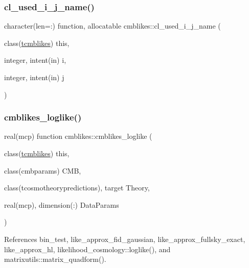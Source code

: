 \mbox{\label{namespacecmblikes_aed345a121b78d08d7aa703636785f56b}} 
\subsubsection{\texorpdfstring{cl\+\_\+used\+\_\+i\+\_\+j\+\_\+name()}{cl\_used\_i\_j\_name()}}
{\footnotesize\ttfamily character(len=\+:) function, allocatable cmblikes\+::cl\+\_\+used\+\_\+i\+\_\+j\+\_\+name (\begin{DoxyParamCaption}\item[{class(\mbox{\hyperlink{structcmblikes_1_1tcmblikes}{tcmblikes}})}]{this,  }\item[{integer, intent(in)}]{i,  }\item[{integer, intent(in)}]{j }\end{DoxyParamCaption})\hspace{0.3cm}{\ttfamily [private]}}

\mbox{\label{namespacecmblikes_a97fb12e9b7c8a1059a8443b1b0423c24}} 
\subsubsection{\texorpdfstring{cmblikes\+\_\+loglike()}{cmblikes\_loglike()}}
{\footnotesize\ttfamily real(mcp) function cmblikes\+::cmblikes\+\_\+loglike (\begin{DoxyParamCaption}\item[{class(\mbox{\hyperlink{structcmblikes_1_1tcmblikes}{tcmblikes}})}]{this,  }\item[{class(cmbparams)}]{C\+MB,  }\item[{class(tcosmotheorypredictions), target}]{Theory,  }\item[{real(mcp), dimension(\+:)}]{Data\+Params }\end{DoxyParamCaption})\hspace{0.3cm}{\ttfamily [private]}}



References bin\+\_\+test, like\+\_\+approx\+\_\+fid\+\_\+gaussian, like\+\_\+approx\+\_\+fullsky\+\_\+exact, like\+\_\+approx\+\_\+hl, likelihood\+\_\+cosmology\+::loglike(), and matrixutils\+::matrix\+\_\+quadform().

